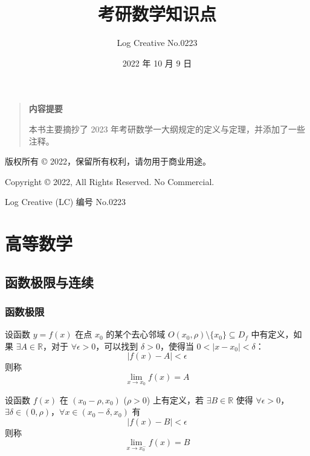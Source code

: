 \documentclass{ctexbook}
\begin{document}
\title{考研数学知识点}
\author{Log Creative No.0223}
\date{2022 年 10 月 9 日}
\maketitle

\begin{quotation}
    \begin{center}
        \bfseries 内\quad{}容\quad{}提\quad{}要
    \end{center}

    本书主要摘抄了 2023 年考研数学一大纲规定的定义与定理，并添加了一些注释。 
\end{quotation}

\vspace{5em}

版权所有 \copyright{} 2022，保留所有权利，请勿用于商业用途。

Copyright \copyright{} 2022, All Rights Reserved. No Commercial.

Log Creative (LC) 编号 No.0223

\tableofcontents

\part{高等数学}

\chapter{函数极限与连续}

\section{函数极限}

\begin{definition}[函数极限]
    设函数 $y=f(x)$ 在点 $x_0$ 的某个去心邻域 $O(x_0,\rho) \setminus \{x_0\}\subseteq D_f$ 中有定义，如果 $\exists A\in \mathbb{R}$，对于 $\forall \epsilon >0$，可以找到 $\delta>0$，使得当 $0<\lvert x-x_0\rvert<\delta$：
    \begin{equation}
        \lvert f(x)-A\rvert<\epsilon
    \end{equation}
    则称
    \begin{equation}
        \lim_{x\rightarrow x_0}f(x)=A
    \end{equation}
\end{definition}

\begin{definition}[单侧极限]
    设函数 $f(x)$ 在 $(x_0-\rho,x_0)$ ($\rho>0$) 上有定义，若 $\exists B\in\mathbb{R}$ 使得 $\forall \epsilon > 0$，$\exists \delta\in(0,\rho)$，$\forall x\in(x_0-\delta, x_0)$ 有
    \begin{equation}
        \lvert f(x)-B\rvert<\epsilon
    \end{equation}
    则称
    \begin{equation}
        \lim_{x\rightarrow x_0^-}f(x)=B
    \end{equation}
\end{definition}
\end{document}
